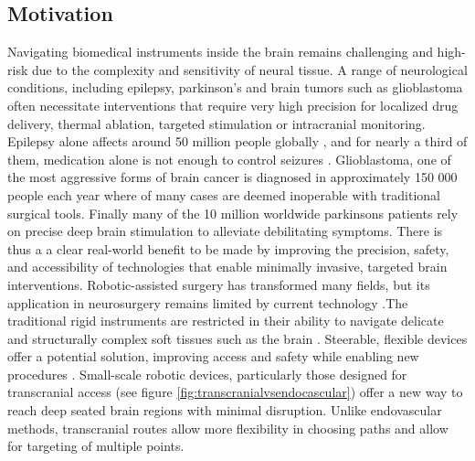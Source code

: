 



\subsection{Motivation}

Navigating biomedical instruments inside the brain remains challenging and high-risk due to the complexity and sensitivity of neural tissue. A range of neurological conditions, including epilepsy, parkinson's and brain tumors such as glioblastoma often necessitate interventions that require very high precision for localized drug delivery, thermal ablation, targeted stimulation or intracranial monitoring. Epilepsy alone affects around 50 million people globally \cite{noauthor_epilepsy_nodate}, and for nearly a third of them, medication alone is not enough to control seizures \cite{sultana_incidence_2021}. Glioblastoma, one of the most aggressive forms of brain cancer is diagnosed in approximately 150 000 people each year \cite{walsh_chapter_2016} where of many cases are deemed inoperable with traditional surgical tools. Finally many of the 10 million worldwide parkinsons patients \cite{noauthor_statistics_nodate} rely on precise deep brain stimulation to alleviate debilitating symptoms. There is thus a a clear real-world benefit to be made by improving the precision, safety, and accessibility of technologies that enable minimally invasive, targeted brain interventions.
\newline \newline
Robotic-assisted surgery has transformed many fields, but its application in neurosurgery remains limited by current technology \cite{doulgeris_robotics_2015}.The traditional rigid instruments are restricted in their ability to navigate delicate and structurally complex soft tissues such as the brain \cite{noseda_flat_2024}. Steerable, flexible devices offer a potential solution, improving access and safety while enabling new procedures \cite{da_veiga_challenges_2020}. Small-scale robotic devices, particularly those designed for transcranial access (see figure \ref{fig:transcranialvsendocascular}) offer a new way to reach deep seated brain regions with minimal disruption. Unlike endovascular methods, transcranial routes allow more flexibility in choosing paths and allow for targeting of multiple points. 

